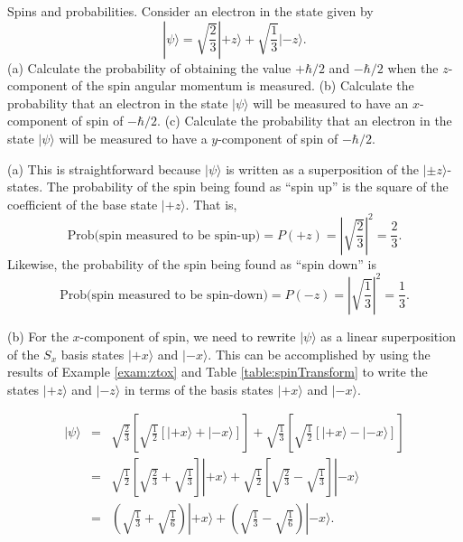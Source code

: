 \begin{example}{Spins and probabilities.} 
\label{exam:spinsProbabilities}
Consider an electron in the state given by
\begin{equation}
|\psi\rangle = \sqrt{\frac{2}{3}}|\mbox{$+z$}\rangle +
 \sqrt{\frac{1}{3}}|\mbox{$-z$}\rangle .
\label{eq:ex3}
\end{equation}
(a) Calculate the probability of obtaining the value $+\hbar/2$ and $-\hbar/2$ when
the $z$-component of the spin angular momentum is measured.  (b) Calculate the probability that an electron in the state $|\psi\rangle$
will be measured to have an $x$-component of spin of $-\hbar/2$.  (c)
Calculate the probability that an electron in the state $|\psi\rangle$
will be measured to have a $y$-component of spin of $-\hbar/2$.
\begin{solution}
(a) This is straightforward because $|\psi\rangle$ is written
as a superposition of the $|\mbox{$\pm z$}\rangle$-states. The probability of
the spin being found as ``spin up'' is the square of the
coefficient of the base state $|\mbox{$+z$}\rangle$. That is,
\begin{equation}
\mbox{Prob}\bigl(\mbox{spin measured to be spin-up}\bigr) = P(+z) = 
\left|\sqrt{\frac{2}{3}}\right|^2 = \frac{2}{3}. \nonumber
\end{equation}
\noindent Likewise, the probability of the spin being found as ``spin down'' is 
\begin{equation}
\mbox{Prob}\bigl(\mbox{spin measured to be spin-down}\bigr) = P(-z) = 
\left|\sqrt{\frac{1}{3}}\right|^2 = \frac{1}{3}.\nonumber
\end{equation}

(b) For the $x$-component of spin, we need to rewrite
$|\mbox{$\psi$}\rangle$ as a linear superposition of the $S_x$ basis
states $|\mbox{$+x$}\rangle$ and $|\mbox{$-x$}\rangle$. This can be
accomplished by using the results of Example \ref{exam:ztox} and Table
\ref{table:spinTransform} to write the states $|\mbox{$+z$}\rangle$ and
$|\mbox{$-z$}\rangle$ in terms of the basis states $|\mbox{$+x$}\rangle$
and $|\mbox{$-x$}\rangle$.

\begin{eqnarray}
|\mbox{$\psi$}\rangle & = & \sqrt{\frac{2}{3}} \left[ \sqrt{\frac{1}{2}} \left[ |\mbox{$+x$}\rangle + |\mbox{$-x$}\rangle \right] \right] + \sqrt{\frac{1}{3}} \left[ \sqrt{\frac{1}{2}} \left[ |\mbox{$+x$}\rangle - |\mbox{$-x$}\rangle \right] \right] \nonumber\\
 & = & \sqrt{\frac{1}{2}} \left[ \sqrt{\frac{2}{3}} + \sqrt{\frac{1}{3}} \right] |\mbox{$+x$}\rangle + \sqrt{\frac{1}{2}} \left[ \sqrt{\frac{2}{3}} - \sqrt{\frac{1}{3}} \right] |\mbox{$-x$}\rangle \nonumber\\
 & = & \left( \sqrt{\frac{1}{3}} + \sqrt{\frac{1}{6}}\right)|\mbox{$+x$}\rangle +  \left( \sqrt{\frac{1}{3}} - \sqrt{\frac{1}{6}}\right)|\mbox{$-x$}\rangle .
\end{eqnarray}


\end{solution}
\end{example}
